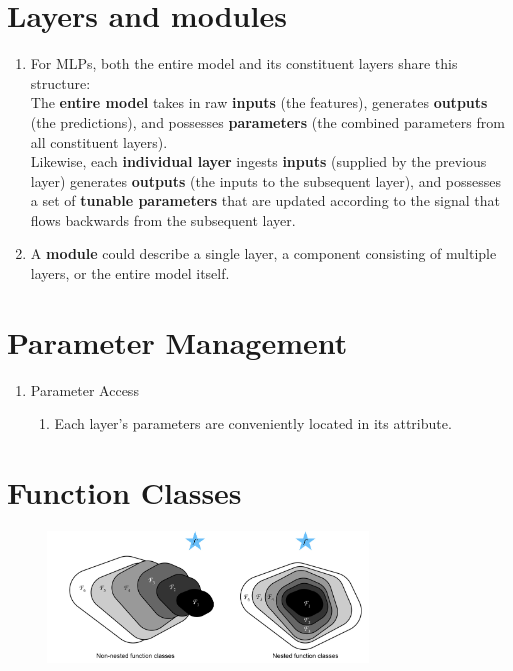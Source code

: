 \section{Layers and modules \cite{dnn-1}}

\begin{enumerate}
    \item For MLPs, both the entire model and its constituent layers share this structure:\\
    The \textbf{entire model} takes in raw \textbf{inputs} (the features), generates \textbf{outputs} (the predictions), and possesses \textbf{parameters} (the combined parameters from all constituent layers).\\
    Likewise, each \textbf{individual layer} ingests \textbf{inputs} (supplied by the previous layer) generates \textbf{outputs} (the inputs to the subsequent layer), and possesses a set of \textbf{tunable parameters} that are updated according to the signal that flows backwards from the subsequent layer.

    \item A \textbf{module}  could describe a single layer, a component consisting of multiple layers, or the entire model itself.

    
\end{enumerate}


\section{Parameter Management \cite{dnn-1}}

\begin{enumerate}[itemsep=0.2cm]
    \item Parameter Access
    \begin{enumerate}
        \item Each layer’s parameters are conveniently located in its attribute.

    \end{enumerate}

\end{enumerate}



\section{Function Classes \cite{dnn-1}} \label{nn: Function Classes}

\begin{figure}[H]
    \centering
    \includegraphics[width=\linewidth, height=3.5cm, keepaspectratio]{Pictures/deep_neural_networks/functionclasses.jpg}
\end{figure}

